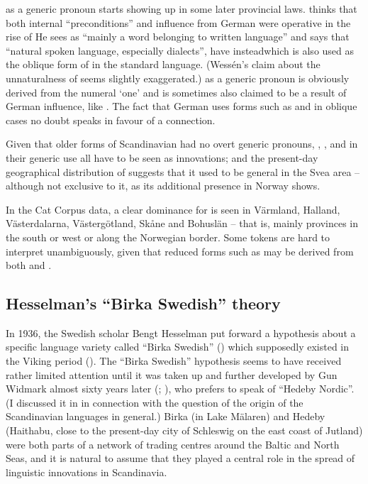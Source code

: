  as a generic pronoun starts showing up in some later provincial laws. \citet[75]{Wessén1956} thinks that both internal “preconditions” and influence from German were operative in the rise of He sees  as “mainly a word belonging to written language” and says that “natural spoken language, especially dialects”, have instead\textstyleLinguisticExample{, }which is also used as the oblique form of  in the standard language. (Wessén’s claim about the unnaturalness of  seems slightly exaggerated.) as a generic pronoun is obviously derived from the numeral ‘one’ and is sometimes also claimed to be a result of German influence, like . The fact that German uses forms such as  and  in oblique cases no doubt speaks in favour of a connection.

Given that older forms of Scandinavian had no overt generic pronouns, , , and  in their generic use all have to be seen as innovations; and the present-day geographical distribution of  suggests that it used to be general in the Svea area – although not exclusive to it, as its additional presence in Norway shows. 

In the Cat Corpus data, a clear dominance for is seen in Värmland, Halland, Västerdalarna, Västergötland, Skåne and Bohuslän – that is, mainly provinces in the south or west or along the Norwegian border. Some tokens are hard to interpret unambiguously, given that reduced forms such as  may be derived from both  and . 

\subsection{Hesselman’s “Birka Swedish” theory}
\label{sec:6.2.5}

In 1936, the Swedish scholar Bengt Hesselman put forward a hypothesis about a specific language variety called “Birka Swedish” () which supposedly existed in the Viking period (\citealt{Hesselman1936}). The “Birka Swedish” hypothesis seems to have received rather limited attention until it was taken up and further developed by Gun Widmark almost sixty years later (\citealt{Widmark1994}; \citealt{Widmark2001}), who prefers to speak of “Hedeby Nordic”. (I discussed it in \citet{Dahl2001} in connection with the question of the origin of the Scandinavian languages in general.) Birka (in Lake Mälaren) and Hedeby (Haithabu, close to the present-day city of Schleswig on the east coast of Jutland) were both parts of a network of trading centres around the Baltic and North Seas, and it is natural to assume that they played a central role in the spread of linguistic innovations in Scandinavia. 

